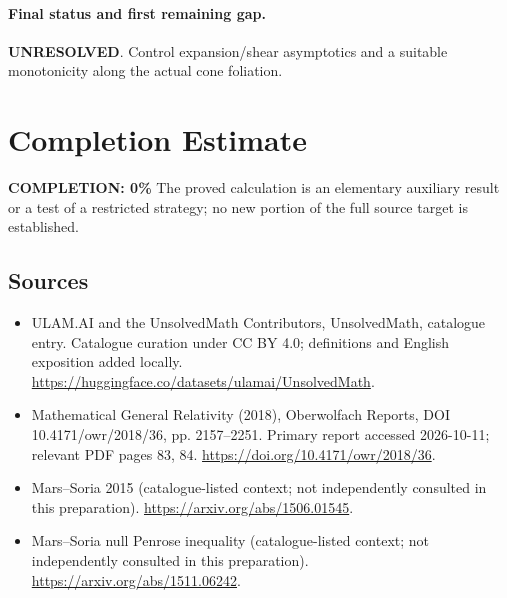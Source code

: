 \documentclass[11pt]{article}
\begin{document}
\paragraph{Final status and first remaining gap.}
\textbf{UNRESOLVED}. Control expansion/shear asymptotics and a suitable monotonicity along the actual cone foliation.

\section{Completion Estimate}
\noindent\textbf{COMPLETION: 0\%}
The proved calculation is an elementary auxiliary result or a test of a restricted strategy; no new portion of the full source target is established.

\subsection{Sources}
\begin{itemize}
\item[\hypertarget{source:statement:1}{S1}] ULAM.AI and the UnsolvedMath Contributors, UnsolvedMath, catalogue entry. Catalogue curation under CC BY 4.0; definitions and English exposition added locally.
\url{https://huggingface.co/datasets/ulamai/UnsolvedMath}.
\item[\hypertarget{source:statement:2}{S2}] Mathematical General Relativity (2018), Oberwolfach Reports, DOI 10.4171/owr/2018/36, pp. 2157--2251. Primary report accessed 2026-10-11; relevant PDF pages 83, 84.
\url{https://doi.org/10.4171/owr/2018/36}.
\item[\hypertarget{source:statement:3}{S3}] Mars--Soria 2015 (catalogue-listed context; not independently consulted in this preparation).
\url{https://arxiv.org/abs/1506.01545}.
\item[\hypertarget{source:statement:4}{S4}] Mars--Soria null Penrose inequality (catalogue-listed context; not independently consulted in this preparation).
\url{https://arxiv.org/abs/1511.06242}.
\end{itemize}
\label{end:statement}
\end{document}
